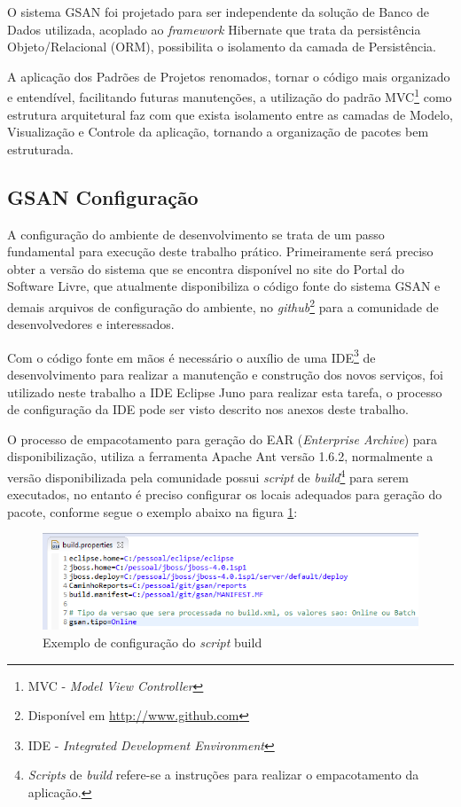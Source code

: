 O sistema GSAN foi projetado para ser independente da solução de Banco de Dados utilizada, acoplado ao \textit{framework} Hibernate que trata da persistência Objeto/Relacional (ORM), possibilita o isolamento da camada de Persistência.

A aplicação dos Padrões de Projetos renomados, tornar o código mais organizado e entendível, facilitando futuras manutenções, a utilização do padrão MVC\footnote{MVC - \textit{Model View Controller}} como estrutura arquitetural faz com que exista isolamento entre as camadas de Modelo, Visualização e Controle da aplicação, tornando a organização de pacotes bem estruturada.
	
	
\subsection{GSAN Configuração}
A configuração do ambiente de desenvolvimento se trata de um passo fundamental para execução deste trabalho prático. Primeiramente será preciso obter a versão do sistema que se encontra disponível no site do Portal do Software Livre, que atualmente disponibiliza o código fonte do sistema GSAN e demais arquivos de configuração do ambiente, no \textit{github}\footnote{Disponível em \url{http://www.github.com}} para a comunidade de desenvolvedores e interessados. 

Com o código fonte em mãos é necessário o auxílio de uma IDE\footnote{IDE - \textit{Integrated Development Environment}} de desenvolvimento para realizar a manutenção e construção dos novos serviços, foi utilizado neste trabalho a IDE Eclipse Juno para realizar esta tarefa, o processo de configuração da IDE pode ser visto descrito nos anexos deste trabalho.

O processo de empacotamento para geração do EAR (\textit{Enterprise Archive}) para disponibilização, utiliza a ferramenta Apache Ant versão 1.6.2, normalmente a versão disponibilizada pela comunidade possui \textit{script} de \textit{build}\footnote{\textit{Scripts} de \textit{build} refere-se a instruções para realizar o empacotamento da aplicação.} para serem executados, no entanto é preciso configurar os locais adequados para geração do pacote, conforme segue o exemplo abaixo na figura \ref{figura:configuracaoScriptBuild}:

\begin{figure}[H]
	\centering
	\caption{Exemplo de configuração do \textit{script} build}
	\label{figura:configuracaoScriptBuild}	
	\includegraphics{figuras/build_properties.png}
\end{figure}
	
